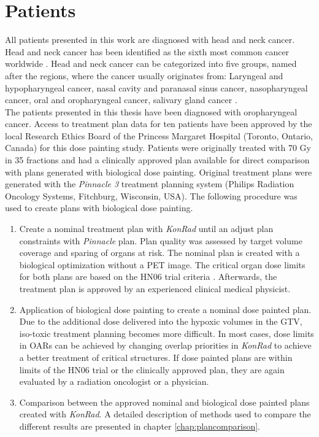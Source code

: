 
\section{Patients}
All patients presented in this work are diagnosed with head and neck cancer. Head and neck cancer has been identified as the sixth most common cancer worldwide \cite{pmid15685196}. Head and neck cancer can be categorized into five groups, named after the regions, where the cancer usually originates from: Laryngeal and hypopharyngeal cancer, nasal cavity and paranasal sinus cancer, nasopharyngeal cancer, oral and oropharyngeal cancer, salivary gland cancer \cite{Brockenstein}.\\The patients presented in this thesis have been diagnosed with oropharyngeal cancer. Access to treatment plan data for ten patients have been approved by the local Research Ethics Board of the Princess Margaret Hospital (Toronto, Ontario, Canada) for this dose painting study. Patients were originally treated with 70 Gy in 35 fractions and had a clinically approved plan available for direct comparison with plans generated with biological dose painting. Original treatment plans were generated with the \textit{Pinnacle 3} treatment planning system (Philips Radiation Oncology Systems, Fitchburg, Wisconsin, USA). The following procedure was used to create plans with biological dose painting.
\begin{enumerate}
\item Create a nominal treatment plan with \textit{KonRad} until an adjust plan constraints with \textit{Pinnacle} plan. Plan quality was assessed by target volume coverage and sparing of organs at risk. The nominal plan is created with a biological optimization without a PET image. The critical organ dose limits for both plans are based on the HN06 trial criteria \cite{HN06}. Afterwards, the treatment plan is approved by an experienced clinical medical physicist.
\item Application of biological dose painting to create a nominal dose painted plan. Due to the additional dose delivered into the hypoxic volumes in the GTV, iso-toxic treatment planning becomes more difficult. In most cases, dose limits in OARs can be achieved by changing overlap priorities in \textit{KonRad} to achieve a better treatment of critical structures. If dose painted plans are within limits of the HN06 trial or the clinically approved plan, they are again evaluated by a radiation oncologist or a physician.
\item Comparison between the approved nominal and biological dose painted plans created with \textit{KonRad}. A detailed description of methods used to compare the different results are presented in chapter \ref{chap:plancomparison}.
\end{enumerate}
